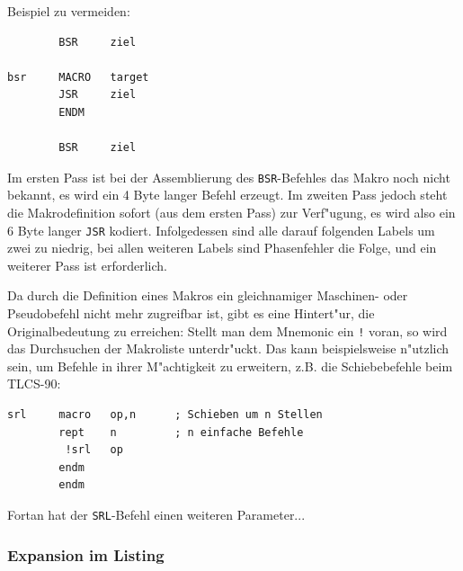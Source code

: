 \documentclass[12pt,a4paper,twoside]{report}
\newcommand{\tty}[1]{{\tt #1}}
\begin{document}
Beispiel zu vermeiden:
\begin{verbatim}
        BSR     ziel

bsr     MACRO   target
        JSR     ziel
        ENDM

        BSR     ziel
\end{verbatim}
Im ersten Pass ist bei der Assemblierung des \tty{BSR}-Befehles das Makro
noch nicht bekannt, es wird ein 4 Byte langer Befehl erzeugt.  Im
zweiten Pass jedoch steht die Makrodefinition sofort (aus dem ersten
Pass) zur Verf"ugung, es wird also ein 6 Byte langer \tty{JSR} kodiert.
Infolgedessen sind alle darauf folgenden Labels um zwei zu niedrig,
bei allen weiteren Labels sind Phasenfehler die Folge, und ein weiterer
Pass ist erforderlich.
\par
Da durch die Definition eines Makros ein gleichnamiger Maschinen- oder
Pseudobefehl nicht mehr zugreifbar ist, gibt es eine Hintert"ur, die
Originalbedeutung zu erreichen: Stellt man dem Mnemonic ein \tty{!} voran,
so wird das Durchsuchen der Makroliste unterdr"uckt.  Das kann
beispielsweise n"utzlich sein, um Befehle in ihrer M"achtigkeit zu
erweitern, z.B. die Schiebebefehle beim TLCS-90:
\begin{verbatim}
srl     macro   op,n      ; Schieben um n Stellen
        rept    n         ; n einfache Befehle
         !srl   op
        endm
        endm
\end{verbatim}
Fortan hat der \tty{SRL}-Befehl einen weiteren Parameter...

\subsubsection{Expansion im Listing}
\end{document}
